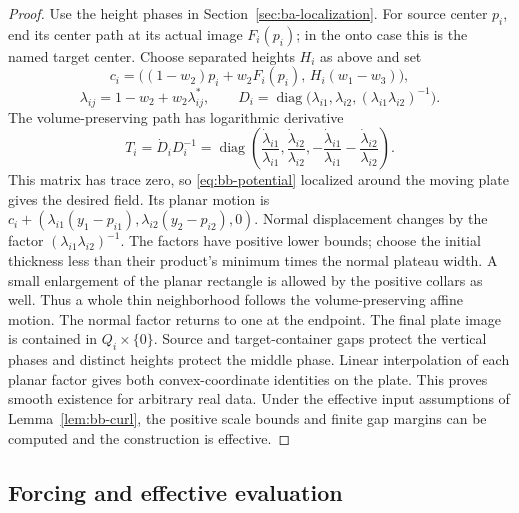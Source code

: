 \begin{proof}\label{ba:plate-routing-proof}
Use the height phases in Section~\ref{sec:ba-localization}. For source
center $p_i$, end its center path at its actual image $F_i(p_i)$; in the
onto case this is the named target center. Choose separated heights $H_i$
as above and set
\[
 c_i=\bigl((1-w_2)p_i+w_2F_i(p_i),\,H_i(w_1-w_3)\bigr),
\]
\[
 \lambda_{ij}=1-w_2+w_2\lambda_{ij}^*,\qquad
 D_i=\operatorname{diag}\bigl(
 \lambda_{i1},\lambda_{i2},(\lambda_{i1}\lambda_{i2})^{-1}\bigr).
\]
The volume-preserving path has logarithmic derivative
\[
 T_i=\dot D_iD_i^{-1}=\operatorname{diag}\left(
 \frac{\dot\lambda_{i1}}{\lambda_{i1}},
 \frac{\dot\lambda_{i2}}{\lambda_{i2}},
 -\frac{\dot\lambda_{i1}}{\lambda_{i1}}
 -\frac{\dot\lambda_{i2}}{\lambda_{i2}}\right).
\]
This matrix has trace zero, so \eqref{eq:bb-potential} localized
around the moving plate gives the desired field.  Its planar motion is
$c_i+(\lambda_{i1}(y_1-p_{i1}),\lambda_{i2}(y_2-p_{i2}),0)$.
Normal displacement changes by the factor
$(\lambda_{i1}\lambda_{i2})^{-1}$. The factors have positive
lower bounds; choose the initial thickness less than their product's
minimum times the normal plateau width.  A small enlargement of the
planar rectangle is allowed by the positive collars as well.  Thus a
whole thin neighborhood follows the volume-preserving affine motion.
The normal factor returns to one at the endpoint. The final plate image
is contained in $Q_i\times\{0\}$. Source and target-container
gaps protect the vertical phases and distinct heights protect the
middle phase.  Linear interpolation of each planar factor gives both
convex-coordinate identities on the plate.
This proves smooth existence for arbitrary real data. Under the effective
input assumptions of Lemma~\ref{lem:bb-curl}, the positive scale bounds and
finite gap margins can be computed and the construction is effective.
\end{proof}

\subsection{Forcing and effective evaluation}

